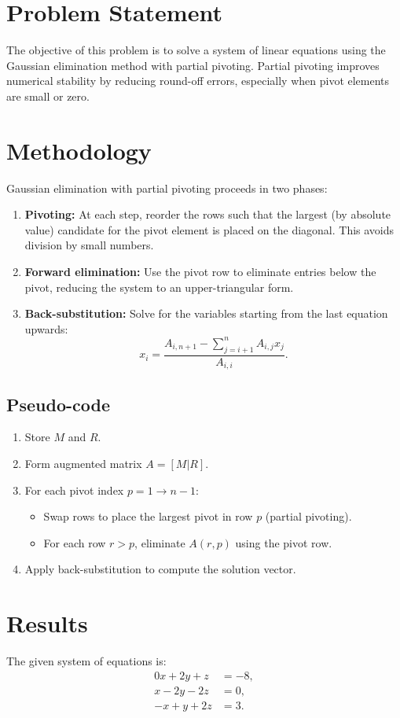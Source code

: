 \section*{Problem Statement} 
The objective of this problem is to solve a system of linear equations using the Gaussian elimination method with partial pivoting. Partial pivoting improves numerical stability by reducing round-off errors, especially when pivot elements are small or zero.

\section*{Methodology} 
Gaussian elimination with partial pivoting proceeds in two phases:

\begin{enumerate}
  \item \textbf{Pivoting:} At each step, reorder the rows such that the largest (by absolute value) candidate for the pivot element is placed on the diagonal. This avoids division by small numbers.
  \item \textbf{Forward elimination:} Use the pivot row to eliminate entries below the pivot, reducing the system to an upper-triangular form.
  \item \textbf{Back-substitution:} Solve for the variables starting from the last equation upwards:
  \[
  x_i = \frac{A_{i,n+1} - \sum_{j=i+1}^{n} A_{i,j}x_j}{A_{i,i}}.
  \]
\end{enumerate}

\subsection*{Pseudo-code}
\begin{enumerate}
  \item Store $M$ and $R$.
  \item Form augmented matrix $A = [M|R]$.
  \item For each pivot index $p = 1 \to n-1$:
  \begin{itemize}
    \item Swap rows to place the largest pivot in row $p$ (partial pivoting).
    \item For each row $r > p$, eliminate $A(r,p)$ using the pivot row.
  \end{itemize}
  \item Apply back-substitution to compute the solution vector.
\end{enumerate}

\section*{Results} 
The given system of equations is:
\[
\begin{aligned}
0x + 2y + z &= -8, \\
x - 2y - 2z &= 0, \\
- x + y + 2z &= 3.
\end{aligned}
\]

